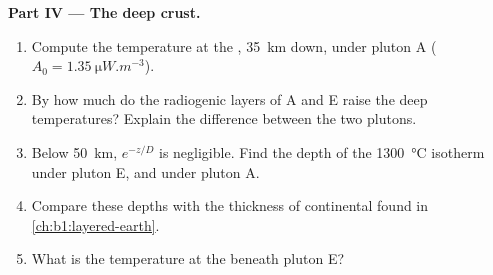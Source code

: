 \begin{problem}
\noindent\textbf{Part IV --- The deep crust.}
\begin{enumerate}[resume]
  \item Compute the temperature at the , \qty{35}{km} down, under pluton A
        ($A_0 = \qty{1.35}{\micro W.m^{-3}}$).
  \item By how much do the radiogenic layers of A and E raise the deep
        temperatures? Explain the difference between the two plutons.
  \item Below \qty{50}{km}, $e^{-z/D}$ is negligible. Find the depth of the
        \qty{1300}{\degreeCelsius} isotherm under pluton E, and under pluton A.
  \item Compare these depths with the thickness of continental 
        found in \cref{ch:b1:layered-earth}.
  \item What is the temperature at the  beneath pluton E?
\end{enumerate}
\end{problem}
